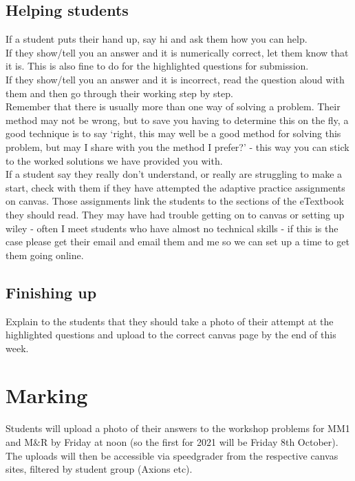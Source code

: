 \documentclass[11.5pt,sans,english]{article}
\begin{document}
\subsection{Helping students}
If a student puts their hand up, say hi and ask them how you can help.\\
If they show/tell you an answer and it is numerically correct, let them know that it is. This is also fine to do for the highlighted questions for submission.\\
If they show/tell you an answer and it is incorrect, read the question aloud with them and then go through their working step by step.\\
Remember that there is usually more than one way of solving a problem. Their method may not be wrong, but to save you having to determine this on the fly, a good technique is to say `right, this may well be a good method for solving this problem, but may I share with you the method I prefer?' - this way you can stick to the worked solutions we have provided you with.\\
If a student say they really don't understand, or really are struggling to make a start, check with them if they have attempted the adaptive practice assignments on canvas. Those assignments link the students to the sections of the eTextbook they should read. They may have had trouble getting on to canvas or setting up wiley - often I meet students who have almost no technical skills - if this is the case please get their email and email them and me so we can set up a time to get them going online. \\

\subsection{Finishing up}
Explain to the students that they should take a photo of their attempt at the highlighted questions and upload to the correct canvas page by the end of this week.\\

\section{Marking}


Students will upload a photo of their answers to the workshop problems for MM1 and M\&R by Friday at noon (so the first for 2021 will be Friday 8th October).\\

The uploads will then be accessible via speedgrader from the respective canvas sites, filtered by student group (Axions etc).\\
\end{document}
